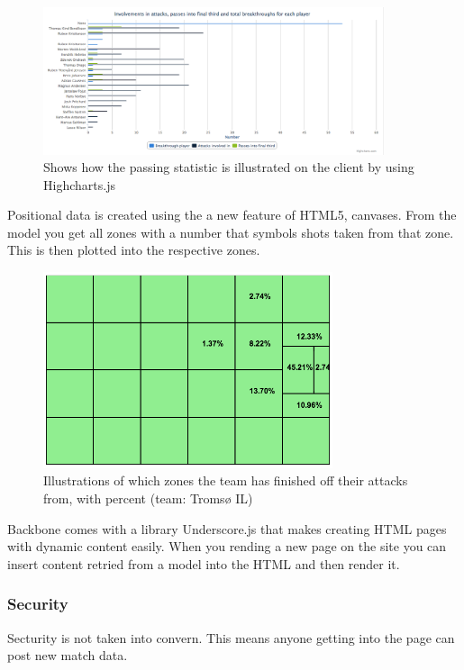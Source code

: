 \begin{figure}[ht!]
\centering
\includegraphics[width=100mm]{images/general/chart_passes.png}
\caption{Shows how the passing statistic is illustrated on the client by using Highcharts.js}
\label{overflow}
\end{figure}

Positional data is created using the a new feature of HTML5, canvases. From the model you get all zones with a number that symbols shots taken from that zone. This is then plotted into the respective zones. 

\begin{figure}[ht!]
\centering
\includegraphics[width=85mm]{images/general/finishing_zones.png}
\caption{Illustrations of which zones the team has finished off their attacks from, with percent (team: Tromsø IL)}
\label{overflow}
\end{figure}

Backbone comes with a library Underscore.js that makes creating HTML pages with dynamic content easily. When you rending a new page on the site you can insert content retried from a model into the HTML and then render it.



\subsubsection{Security}
Secturity is not taken into convern. This means anyone getting into the page can post new match data. 